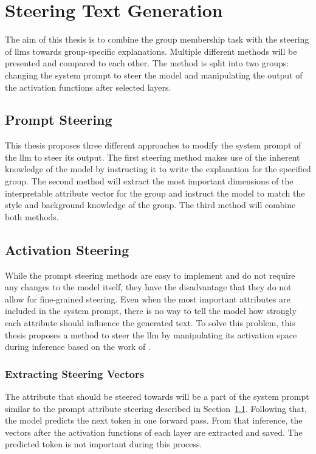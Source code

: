 \section{Steering Text Generation}%
\label{sec:approach:steering}
The aim of this thesis is to combine the group membership task with the steering of \aclp{llm} towards group-specific explanations. Multiple different methods will be presented and compared to each other. The method is split into two groups: changing the system prompt to steer the model and manipulating the output of the activation functions after selected layers.

\subsection{Prompt Steering}%
\label{sec:approach:steering:prompt}
This thesis proposes three different approaches to modify the system prompt of the \ac{llm} to steer its output. The first steering method makes use of the inherent knowledge of the model by instructing it to write the explanation for the specified group. The second method will extract the most important dimensions of the interpretable attribute vector for the group and instruct the model to match the style and background knowledge of the group. The third method will combine both methods.


\subsection{Activation Steering}%
\label{sec:approach:steering:activation}
While the prompt steering methods are easy to implement and do not require any changes to the model itself, they have the disadvantage that they do not allow for fine-grained steering. Even when the most important attributes are included in the system prompt, there is no way to tell the model how strongly each attribute should influence the generated text. To solve this problem, this thesis proposes a method to steer the \ac{llm} by manipulating its activation space during inference based on the work of \citet{konenStyleVectorsSteering2024,turnerActivationAdditionSteering2024,rimsky-etal-2024-steering}.

\subsubsection{Extracting Steering Vectors}
The attribute that should be steered towards will be a part of the system prompt similar to the prompt attribute steering described in Section~\ref{sec:approach:steering:prompt}. Following that, the model predicts the next token in one forward pass. From that inference, the vectors after the activation functions of each layer are extracted and saved. The predicted token is not important during this process.

